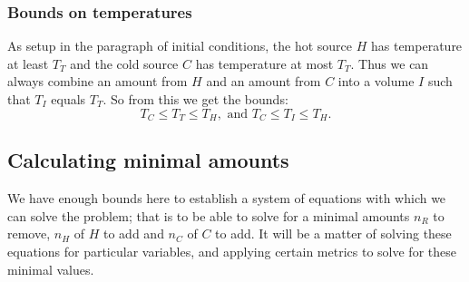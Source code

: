 \documentclass{article}
\begin{document}
\begin{example}
\end{example}

\subsubsection*{Bounds on temperatures}

As setup in the paragraph of initial conditions, the hot source $H$ has temperature at least $T_T$
and the cold source $C$ has temperature at most $T_T$.
Thus we can always combine an amount from
$H$ and an amount from $C$ into a volume $I$ such that $T_I$ equals $T_T$.
So from this we get the bounds:
\[
    T_C\le T_T\le T_H,\text{ and }T_C\le T_I\le T_H.
\]

\subsection{Calculating minimal amounts}

We have enough bounds here to establish a system of equations with which we can solve the problem;
that is to be able to solve for a minimal amounts $n_R$ to remove, $n_H$ of $H$ to add and $n_C$ of
$C$ to add. It will be a matter of solving these equations for particular variables, and applying
certain metrics to solve for these minimal values.
\end{document}
